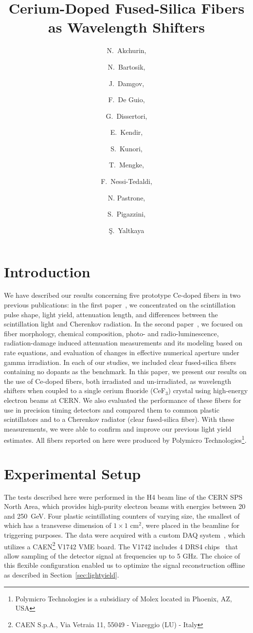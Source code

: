 \documentclass[a4paper,11pt]{article}
\title{\boldmath  Cerium-Doped Fused-Silica Fibers
as Wavelength Shifters}
\author[a,1]{N.~Akchurin,\note{Corresponding author.}}
\author[d]{N.~Bartosik,}
\author[a]{J.~Damgov,}
\author[a]{F.~De Guio,}
\author[c]{G.~Dissertori,}
\author[b]{E.~Kendir,}
\author[a]{S.~Kunori,}
\author[a]{T.~Mengke,}
\author[c]{F.~Nessi-Tedaldi,}
\author[d]{N. Pastrone,}
\author[c]{S.~Pigazzini,}
\author[b]{\c{S}.~Yaltkaya}
\affiliation[a]{Texas Tech University, Department of Physics and Astronomy,  Lubbock, TX, 79409, USA}
\affiliation[b]{Akdeniz University, Department of Physics, Antalya, 07070, Turkey}
\affiliation[c]{ETH, Z\"urich, Switzerland}
\affiliation[d]{INFN-Torino, Italy}
\begin{document}
\maketitle
\flushbottom

\section{Introduction}
\label{sec:intro}
We have described our results concerning five prototype Ce-doped fibers in two previous publications:  in the first paper~\cite{JINSTPaper}, we concentrated on the scintillation pulse shape, light yield, attenuation length, and differences between the scintillation light and Cherenkov radiation.  In the second paper~\cite{JINSTPaper2}, we focused on fiber morphology, chemical composition, photo- and radio-luminescence, radiation-damage induced attenuation measurements and its modeling based on rate equations, and evaluation of changes in effective numerical aperture under gamma irradiation.   In each of our studies, we included clear fused-silica fibers containing no dopants  as the benchmark. In this paper, we present our results on the use of Ce-doped fibers, both irradiated and un-irradiated, as wavelength shifters when coupled to a single cerium fluoride (CeF$_3$) crystal using high-energy electron beams at CERN.  We also evaluated the performance of these fibers for use in precision timing detectors and compared them to common plastic scintillators and to a Cherenkov radiator (clear fused-silica fiber).  With these measurements, we were able to confirm and improve our previous light yield estimates.  All fibers reported on here were produced by Polymicro Technologies\footnote{Polymicro Technologies is a subsidiary of Molex located in Phoenix, AZ, USA}.

\section{Experimental Setup}
\label{sec:experimentalsetup}


The tests described here were performed in the H4 beam line of the CERN SPS North Area, which provides high-purity electron beams with energies between 20 and 250~GeV.  Four plastic scintillating counters of varying size, the smallest of which has a transverse dimension of $1 \times 1$ cm$^2$, were placed in the beamline for triggering purposes.  The data were acquired with a custom DAQ system~\cite{r-MAR}, which utilizes a CAEN\footnote{CAEN S.p.A., Via Vetraia 11, 55049 - Viareggio (LU) - Italy} V1742 VME board. The V1742 includes 4 DRS4 chips~\cite{r-DRS4} that allow sampling of the detector signal at frequencies up to 5 GHz. The choice of this flexible configuration enabled us to optimize the signal reconstruction offline as described in Section~\ref{sec:lightyield}.
\end{document}
